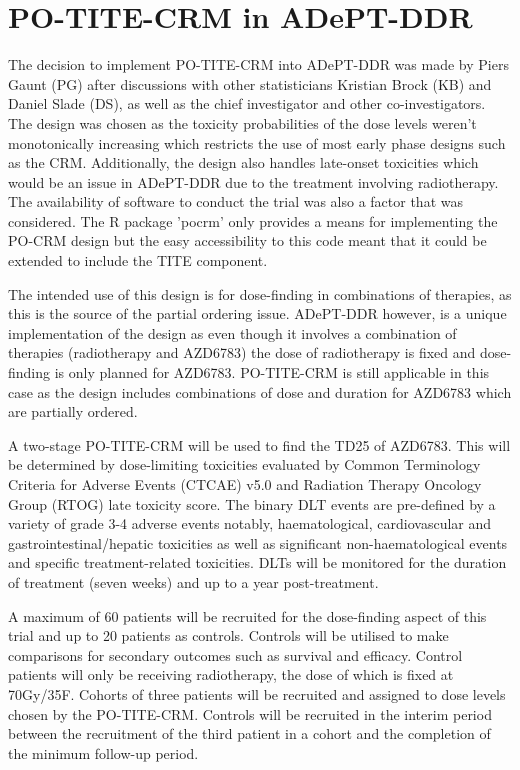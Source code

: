
\section{PO-TITE-CRM in ADePT-DDR}  
\label{section2.3}%
The decision to implement PO-TITE-CRM into ADePT-DDR was made by Piers Gaunt (PG) after discussions with other statisticians Kristian Brock (KB) and Daniel Slade (DS), as well as the chief investigator and other co-investigators. The design was chosen as the toxicity probabilities of the dose levels weren't monotonically increasing which restricts the use of most early phase designs such as the CRM. Additionally, the design also handles late-onset toxicities which would be an issue in ADePT-DDR due to the treatment involving radiotherapy. The availability of software to conduct the trial was also a factor that was considered. The R package 'pocrm' \cite{wagesPocrmRpackagePhase2013} only provides a means for implementing the PO-CRM design but the easy accessibility to this code meant that it could be extended to include the TITE component.  

The intended use of this design is for dose-finding in combinations of therapies, as this is the source of the partial ordering issue. ADePT-DDR however, is a unique implementation of the design as even though it involves a combination of therapies (radiotherapy and AZD6783) the dose of radiotherapy is fixed and dose-finding is only planned for AZD6783. PO-TITE-CRM is still applicable in this case as the design includes combinations of dose and duration for AZD6783 which are partially ordered. 

A two-stage PO-TITE-CRM will be used to find the TD25 of AZD6783. This will be determined by dose-limiting toxicities evaluated by Common Terminology Criteria for Adverse Events (CTCAE) v5.0 and Radiation Therapy Oncology Group (RTOG) late toxicity score. The binary DLT events are pre-defined by a variety of grade 3-4 adverse events notably, haematological, cardiovascular and gastrointestinal/hepatic toxicities as well as significant non-haematological events and specific treatment-related toxicities. DLTs will be monitored for the duration of treatment (seven weeks) and up to a year post-treatment. 

A maximum of 60 patients will be recruited for the dose-finding aspect of this trial and up to 20 patients as controls. Controls will be utilised to make comparisons for secondary outcomes such as survival and efficacy. Control patients will only be receiving radiotherapy, the dose of which is fixed at 70Gy/35F. Cohorts of three patients will be recruited and assigned to dose levels chosen by the PO-TITE-CRM. Controls will be recruited in the interim period between the recruitment of the third patient in a cohort and the completion of the minimum follow-up period.    

